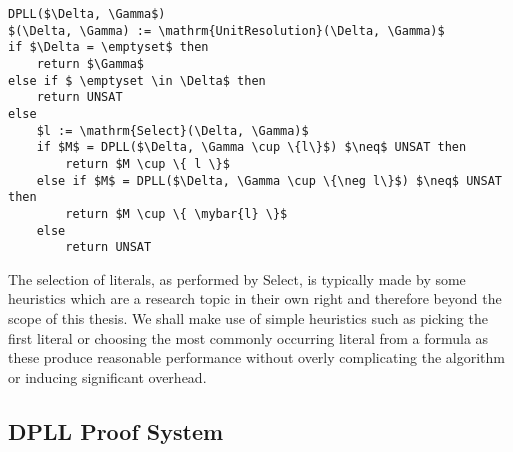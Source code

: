 \begin{lstlisting}[caption = Example DPLL Algorithm,mathescape, label = cl:dpllalg]
DPLL($\Delta, \Gamma$)
$(\Delta, \Gamma) := \mathrm{UnitResolution}(\Delta, \Gamma)$
if $\Delta = \emptyset$ then
    return $\Gamma$
else if $ \emptyset \in \Delta$ then
    return UNSAT
else
    $l := \mathrm{Select}(\Delta, \Gamma)$
    if $M$ = DPLL($\Delta, \Gamma \cup \{l\}$) $\neq$ UNSAT then
        return $M \cup \{ l \}$ 
    else if $M$ = DPLL($\Delta, \Gamma \cup \{\neg l\}$) $\neq$ UNSAT then 
        return $M \cup \{ \mybar{l} \}$ 
    else
        return UNSAT
\end{lstlisting}

The selection of literals,  as performed by $\mathrm{Select}$, is typically made by some heuristics which are a research topic in their own right and therefore beyond the scope of this thesis. We shall make use of simple heuristics such as  picking the first literal  or choosing the most commonly occurring literal  from a formula as these produce reasonable performance without overly complicating the algorithm or inducing significant overhead.

\subsection*{DPLL Proof System}

